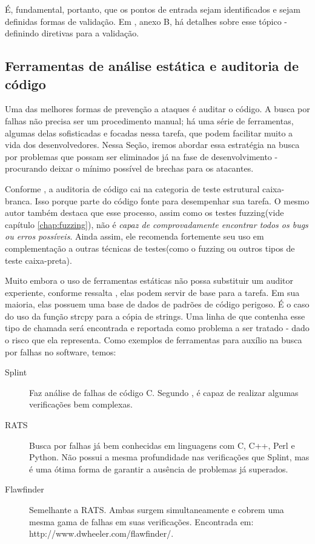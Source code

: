 			É, fundamental, portanto, que os pontos de entrada sejam identificados e sejam
			definidas formas de validação. Em \cite{Secure2006}, anexo B, há detalhes sobre
			esse tópico - definindo diretivas para a validação.
			
		\subsection{Ferramentas de análise estática e auditoria de código}
			Uma das melhores formas de prevenção a ataques é auditar o código. 
			A busca por falhas não precisa ser um procedimento manual; há uma série de ferramentas,
			algumas delas sofisticadas e focadas nessa tarefa, que podem facilitar muito a vida
			dos desenvolvedores.
			Nessa Seção, iremos abordar essa estratégia na busca por problemas 
			que possam ser eliminados já na fase de desenvolvimento - procurando
			deixar o mínimo possível de brechas para os atacantes.
			
			
			Conforme \cite{Ari2008}, a auditoria de código cai na categoria de teste
			estrutural caixa-branca. Isso porque parte do código fonte para desempenhar sua tarefa.
			O mesmo autor também destaca que esse processo,
			assim como os testes fuzzing(vide capítulo \ref{chap:fuzzing}), não é
			\textsl{capaz de comprovadamente encontrar todos os \textsl{bugs} ou erros possíveis}. 
			Ainda assim, ele recomenda fortemente seu uso em complementação a outras técnicas
			de testes(como o fuzzing ou outros tipos de teste caixa-preta).


			Muito embora o uso de ferramentas estáticas não possa substituir um auditor experiente,
			conforme ressalta \cite{Anley2007}, elas podem servir de base para a tarefa.
			Em sua maioria, elas possuem uma base de dados de padrões de código perigoso.
			É o caso do uso da função strcpy para a cópia de strings. Uma linha de que contenha
			esse tipo de chamada será encontrada e reportada como problema a ser tratado - dado
			o risco que ela representa.
			Como exemplos de ferramentas para auxílio na busca por falhas no software, temos:
			\begin{description}
				\item[Splint]{Faz análise de falhas de código C. Segundo \cite{Anley2007}, é capaz
					de realizar algumas verificações bem complexas.}
				\item[RATS]{Busca por falhas já bem conhecidas em linguagens com C, C++, Perl e Python.
					Não possui a mesma profundidade nas verificações que Splint, mas é uma ótima
					forma de garantir a ausência de problemas já superados.}
				\item[Flawfinder]{Semelhante a RATS. Ambas surgem simultaneamente e cobrem uma mesma
					gama de falhas em suas verificações. Encontrada em: http://www.dwheeler.com/flawfinder/.}
			\end{description}
			

